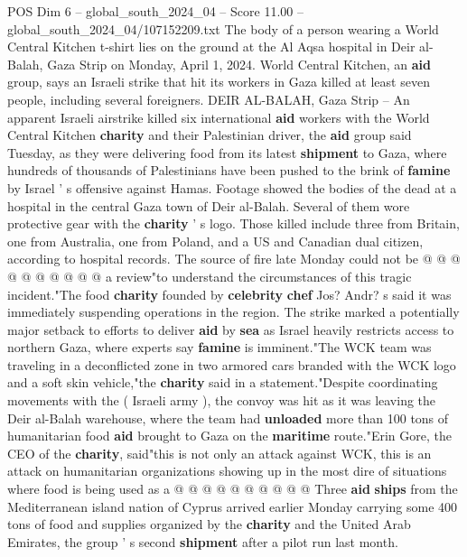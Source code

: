 \begin{textsample}{POS Dim 6 – global\_south\_2024\_04 – Score 11.00 – global\_south\_2024\_04/107152209.txt}  \label{ex:f6_pos_082}
The body of a person wearing a World Central Kitchen t-shirt lies on the ground at the Al Aqsa hospital in Deir al-Balah, Gaza Strip on Monday, April 1, 2024.
World Central Kitchen, an \textbf{aid} group, says an Israeli strike that hit its workers in Gaza killed at least seven people, including several foreigners.
DEIR AL-BALAH, Gaza Strip -- An apparent Israeli airstrike killed six international \textbf{aid} workers with the World Central Kitchen \textbf{charity} and their Palestinian driver, the \textbf{aid} group said Tuesday, as they were delivering food from its latest \textbf{shipment} to Gaza, where hundreds of thousands of Palestinians have been pushed to the brink of \textbf{famine} by Israel ' s offensive against Hamas.
Footage showed the bodies of the dead at a hospital in the central Gaza town of Deir al-Balah.
Several of them wore protective gear with the \textbf{charity} ' s logo.
Those killed include three from Britain, one from Australia, one from Poland, and a US and Canadian dual citizen, according to hospital records.
The source of fire late Monday could not be @ @ @ @ @ @ @ @ @ @ a review"to understand the circumstances of this tragic incident."The food \textbf{charity} founded by \textbf{celebrity} \textbf{chef} Jos?
Andr? s said it was immediately suspending operations in the region.
The strike marked a potentially major setback to efforts to deliver \textbf{aid} by \textbf{sea} as Israel heavily restricts access to northern Gaza, where experts say \textbf{famine} is imminent."The WCK team was traveling in a deconflicted zone in two armored cars branded with the WCK logo and a soft skin vehicle,"the \textbf{charity} said in a statement."Despite coordinating movements with the ( Israeli army ), the convoy was hit as it was leaving the Deir al-Balah warehouse, where the team had \textbf{unloaded} more than 100 tons of humanitarian food \textbf{aid} brought to Gaza on the \textbf{maritime} route."Erin Gore, the CEO of the \textbf{charity}, said"this is not only an attack against WCK, this is an attack on humanitarian organizations showing up in the most dire of situations where food is being used as a @ @ @ @ @ @ @ @ @ @ Three \textbf{aid} \textbf{ships} from the Mediterranean island nation of Cyprus arrived earlier Monday carrying some 400 tons of food and supplies organized by the \textbf{charity} and the United Arab Emirates, the group ' s second \textbf{shipment} after a pilot run last month.

\end{textsample}
